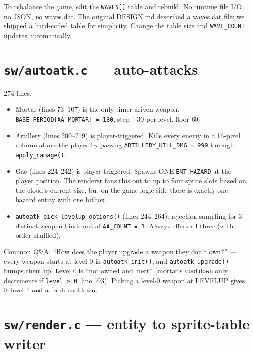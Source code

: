\documentclass[11pt,letterpaper]{article}
\begin{document}
To rebalance the game, edit the \texttt{WAVES[]} table and rebuild. No
runtime file I/O, no JSON, no waves.dat. The original DESIGN.md described a
waves.dat file; we shipped a hard-coded table for simplicity. Change the
table size and \texttt{WAVE\_COUNT} updates automatically.

\section{\texttt{sw/autoatk.c} --- auto-attacks}

274 lines.

\begin{itemize}[leftmargin=*]
  \item Mortar (lines 73--107) is the only timer-driven weapon.
    \texttt{BASE\_PERIOD[AA\_MORTAR] = 180}, step $-30$ per level, floor 60.
  \item Artillery (lines 200--219) is player-triggered. Kills every enemy
    in a 16-pixel column above the player by passing
    \texttt{ARTILLERY\_KILL\_DMG = 999} through \texttt{apply\_damage()}.
  \item Gas (lines 224--242) is player-triggered. Spawns ONE
    \texttt{ENT\_HAZARD} at the player position. The renderer fans this
    out to up to four sprite slots based on the cloud's current size, but
    on the game-logic side there is exactly one hazard entity with one
    hitbox.
  \item \texttt{autoatk\_pick\_levelup\_options()} (lines 244--264):
    rejection sampling for 3 distinct weapon kinds out of \texttt{AA\_COUNT
    = 3}. Always offers all three (with order shuffled).
\end{itemize}

Common Q\&A: ``How does the player upgrade a weapon they don't own?'' ---
every weapon starts at level 0 in \texttt{autoatk\_init()}, and
\texttt{autoatk\_upgrade()} bumps them up. Level 0 is ``not owned and
inert'' (mortar's \texttt{cooldown} only decrements if \texttt{level > 0},
line 103). Picking a level-0 weapon at LEVELUP gives it level 1 and a fresh
cooldown.

\section{\texttt{sw/render.c} --- entity to sprite-table writer}
\end{document}
